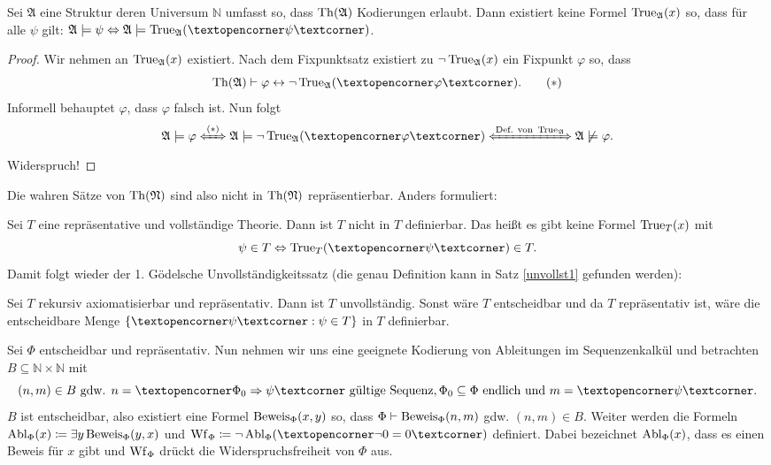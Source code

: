 \begin{satz}
	Sei $\mathfrak{A}$ eine Struktur deren Universum $\mathbb{N}$ umfasst so, dass $\operatorname{Th}(\mathfrak{A})$ Kodierungen erlaubt. Dann existiert keine Formel $\operatorname{True}_\mathfrak{A}(x)$ so, dass für alle $\psi$ gilt: $\mathfrak{A}\models\psi\Leftrightarrow\mathfrak{A}\models \True_\mathfrak{A}(\opencorner\psi\closecorner)$.
\end{satz}
\begin{proof}
	Wir nehmen an $\operatorname{True}_\mathfrak{A}(x)$ existiert.
	Nach dem Fixpunktsatz existiert zu $\neg \operatorname{True}_\mathfrak{A}(x)$ ein Fixpunkt $\varphi$ so, dass
	\[\Th(\mathfrak{A})\vdash\varphi\leftrightarrow\neg \True_\mathfrak{A}(\opencorner\varphi\closecorner). \tag{$\ast$}\]
	Informell \glqq behauptet\grqq{} $\varphi$, dass $\varphi$ falsch ist. Nun folgt
	\[\mathfrak{A}\models\varphi \xLeftrightarrow{(\ast)} \mathfrak{A}\models\neg \True_\mathfrak{A}(\opencorner\varphi\closecorner) \xLeftrightarrow{\text{Def. von } \True_\mathfrak{A}}\mathfrak{A}\not\models\varphi.\] Widerspruch!
\end{proof}
Die wahren Sätze von $\operatorname{Th}(\mathfrak{N})$ sind also nicht in $\operatorname{Th}(\mathfrak{N})$ repräsentierbar. Anders formuliert:

Sei $T$ eine repräsentative und vollständige Theorie. Dann ist $T$ nicht in $T$ definierbar. Das heißt es gibt keine Formel $\operatorname{True}_T(x)$ mit $$\psi\in T\Leftrightarrow \True_T(\opencorner\psi\closecorner)\in T.$$
Damit folgt wieder der 1. Gödelsche Unvollständigkeitssatz (die genau Definition kann in Satz \ref{unvollst1} gefunden werden): 

Sei $T$ rekursiv axiomatisierbar und repräsentativ. Dann ist $T$ unvollständig. Sonst wäre $T$ entscheidbar und da $T$ repräsentativ ist, wäre die entscheidbare Menge $\{\opencorner\psi\closecorner:\psi\in T\}$ in $T$ definierbar.
\\
\par
Sei $\Phi$ entscheidbar und repräsentativ. Nun nehmen wir uns eine geeignete Kodierung von Ableitungen im Sequenzenkalkül und betrachten $B\subseteq\mathbb{N}\times\mathbb{N}$ mit 
$$(n,m)\in B \text{ gdw. } n=\opencorner \Phi_0\Rightarrow\psi \closecorner \text{ gültige Sequenz}, \Phi_0\subseteq\Phi \text{ endlich und } m=\opencorner\psi\closecorner.$$
$B$ ist entscheidbar, also existiert eine Formel $\operatorname{Beweis}_\Phi(x,y)$ so, dass $\Phi\vdash \operatorname{Beweis}_\Phi(n,m)$ gdw. $(n,m)\in B$. 
Weiter werden die Formeln $\operatorname{Abl}_\Phi(x)\coloneqq\exists y \operatorname{Beweis}_\Phi(y,x)$ und $\Wf_\Phi\coloneqq \neg \Abl_\Phi(\opencorner\neg0=0\closecorner)$ definiert. Dabei bezeichnet $\operatorname{Abl}_\Phi(x)$, dass es einen Beweis für $x$ gibt und $\operatorname{Wf}_\Phi$ drückt die Widerspruchsfreiheit von $\Phi$ aus.

